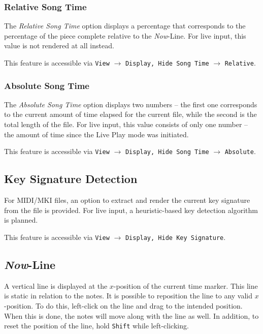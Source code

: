 \documentclass[english]{article}
\providecommand{\mi}[1]{\texttt{#1}}
\begin{document}
\subsubsection{Relative Song Time}

The \textit{Relative Song Time} option displays a percentage that corresponds to the percentage of the piece
complete relative to the \textit{Now}-Line. For live input, this value is not rendered at all instead.

This feature is accessible via 
\mi{View} $\rightarrow$ \mi{{Display, Hide} Song Time} $\rightarrow$ \mi{Relative}.

\subsubsection{Absolute Song Time}

The \textit{Absolute Song Time} option displays two numbers -- the first one corresponds to the 
current amount of time elapsed for the current file, while the second is the total length of the file.
For live input, this value consists of only one number --
the amount of time since the Live Play mode was initiated.

This feature is accessible via 
\mi{View} $\rightarrow$ \mi{{Display, Hide} Song Time} $\rightarrow$ \mi{Absolute}.

\subsection{Key Signature Detection}

For MIDI/MKI files, an option to extract and render the current key signature from the file is provided. For live input,
a heuristic-based key detection algorithm is planned.

This feature is accessible via 
\mi{View} $\rightarrow$ \mi{{Display, Hide} Key Signature}.

\subsection{\textit{Now}-Line}

A vertical line is displayed at the $x$-position of the current time marker. This line is static in relation to the notes.
It is possible to reposition the line to any valid $x$-position. To do this, left-click on the line and drag to the 
intended position. When this is done, the notes will move along with the line as well. In addition, to reset the position of
the line, hold \mi{Shift} while left-clicking.
\end{document}
